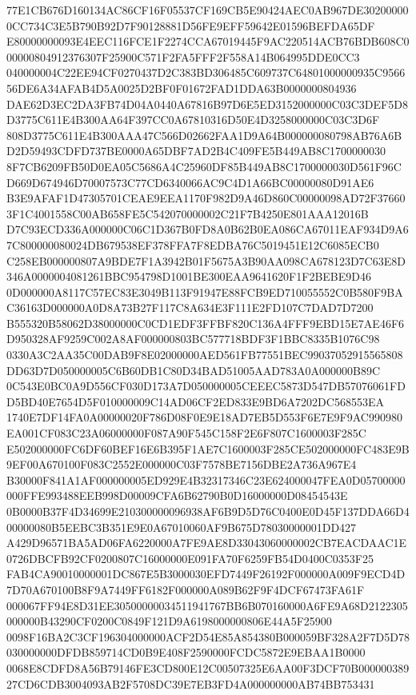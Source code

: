 \documentclass[UTF8,fontset=fandol,zihao=-4,a4paper]{ctexart}
\begin{document}
{{77E1CB676D160134AC86CF16F05537CF169CB5E90424AEC0AB967DE302000000CC734C3E5B790B92D7F90128881D56FE9EFF59642E01596BEFDA65DF
E80000000093E4EEC116FCE1F2274CCA67019445F9AC220514ACB76BDB608C000000804912376307F25900C571F2FA5FFF2F558A14B064995DDE0CC3
040000004C22EE94CF0270437D2C383BD306485C609737C64801000000935C956656DE6A34AFAB4D5A0025D2BF0F01672FAD1DDA63B0000000804936
DAE62D3EC2DA3FB74D04A0440A67816B97D6E5ED3152000000C03C3DEF5D8D3775C611E4B300AA64F397CC0A67810316D50E4D3258000000C03C3D6F
808D3775C611E4B300AAA47C566D02662FAA1D9A64B000000080798AB76A6BD2D59493CDFD737BE0000A65DBF7AD2B4C409FE5B449AB8C1700000030
8F7CB6209FB50D0EA05C5686A4C25960DF85B449AB8C1700000030D561F96CD669D674946D70007573C77CD6340066AC9C4D1A66BC00000080D91AE6
B3E9AFAF1D47305701CEAE9EEA1170F982D9A46D860C00000098AD72F376603F1C4001558C00AB658FE5C542070000002C21F7B4250E801AAA12016B
D7C93ECD336A000000C06C1D367B0FD8A0B62B0EA086CA67011EAF934D9A67C800000080024DB679538EF378FFA7F8EDBA76C5019451E12C6085ECB0
C258EB000000807A9BDE7F1A3942B01F5675A3B90AA098CA678123D7C63E8D346A0000004081261BBC954798D1001BE300EAA9641620F1F2BEBE9D46
0D000000A8117C57EC83E3049B113F91947E88FCB9ED710055552C0B580F9BAC36163D000000A0D8A73B27F117C8A634E3F111E2FD107C7DAD7D7200
B555320B58062D38000000C0CD1EDF3FFBF820C136A4FFF9EBD15E7AE46F6D950328AF9259C002A8AF000000803BC577718BDF3F1BBC8335B1076C98
0330A3C2AA35C00DAB9F8E02000000AED561FB77551BEC99037052915565808DD63D7D050000005C6B60DB1C80D34BAD51005AAD783A0A000000B89C
0C543E0BC0A9D556CF030D173A7D050000005CEEEC5873D547DB57076061FDD5BD40E7654D5F010000009C14AD06CF2ED833E9BD6A7202DC568553EA
1740E7DF14FA0A00000020F786D08F0E9E18AD7EB5D553F6E7E9F9AC990980EA001CF083C23A06000000F087A90F545C158F2E6F807C1600003F285C
E502000000FC6DF60BEF16E6B395F1AE7C1600003F285CE502000000FC483E9B9EF00A670100F083C2552E000000C03F7578BE7156DBE2A736A967E4
B30000F841A1AF000000005ED929E4B32317346C23E624000047FEA0D05700000000FFE993488EEB998D00009CFA6B62790B0D16000000D08454543E
0B0000B37F4D34699E210300000096938AF6B9D5D76C0400E0D45F137DDA66D400000080B5EEBC3B351E9E0A67010060AF9B675D78030000001DD427
A429D96571BA5AD06FA6220000A7FE9AE8D33043060000002CB7EACDAAC1E0726DBCFB92CF0200807C16000000E091FA70F6259FB54D0400C0353F25
FAB4CA90010000001DC867E5B3000030EFD7449F26192F000000A009F9ECD4D7D70A670100B8F9A7449FF6182F000000A089B62F9F4DCF67473FA61F
000067FF94E8D31EE30500000034511941767BB6B070160000A6FE9A68D2122305000000B43290CF0200C0849F121D9A6198000000806E44A5F25900
0098F16BA2C3CF196304000000ACF2D54E85A854380B000059BF328A2F7D5D78030000000DFDB859714CD0B9E408F2590000FCDC5872E9EBAA1B0000
0068E8CDFD8A56B79146FE3CD800E12C00507325E6AA00F3DCF70B00000038927CD6CDB3004093AB2F5708DC39E7EB3FD4A000000000AB74BB753431
}}
\end{document}
